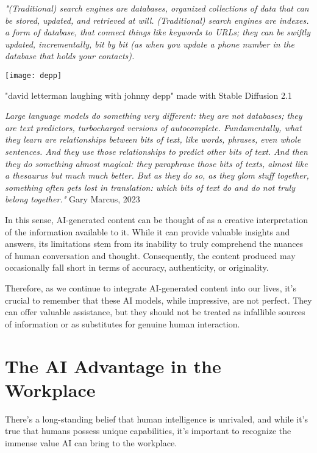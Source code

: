 \textit{"(Traditional) search engines are databases, organized collections of data that can be stored, updated, and retrieved at will. (Traditional) search engines are indexes. a form of database, that connect things like keywords to URLs; they can be swiftly updated, incrementally, bit by bit (as when you update a phone number in the database that holds your contacts).}

\begin{marginfigure}[-5.5cm]
        \texttt{[image: depp]}
        \caption{"david letterman laughing with johnny depp" made with Stable Diffusion 2.1}
\end{marginfigure}

\textit{Large language models do something very different: they are not databases; they are text predictors, turbocharged versions of autocomplete. Fundamentally, what they learn are relationships between bits of text, like words, phrases, even whole sentences. And they use those relationships to predict other bits of text. And then they do something almost magical: they paraphrase those bits of texts, almost like a thesaurus but much much better. But as they do so, as they glom stuff together, something often gets lost in translation: which bits of text do and do not truly belong together."} Gary Marcus, 2023 

In this sense, AI-generated content can be thought of as a creative interpretation of the information available to it. While it can provide valuable insights and answers, its limitations stem from its inability to truly comprehend the nuances of human conversation and thought. Consequently, the content produced may occasionally fall short in terms of accuracy, authenticity, or originality.

Therefore, as we continue to integrate AI-generated content into our lives, it's crucial to remember that these AI models, while impressive, are not perfect. They can offer valuable assistance, but they should not be treated as infallible sources of information or as substitutes for genuine human interaction.

\section{The AI Advantage in the Workplace}

There's a long-standing belief that human intelligence is unrivaled, and while it's true that humans possess unique capabilities, it's important to recognize the immense value AI can bring to the workplace.

